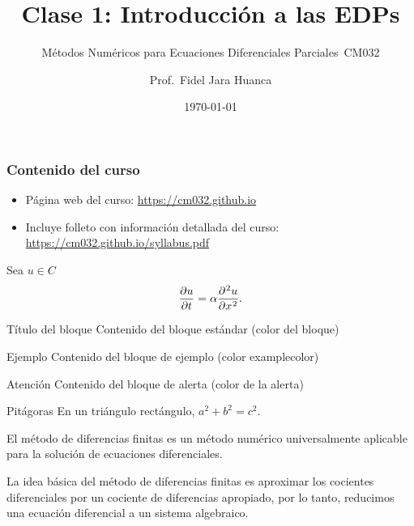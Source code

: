 \documentclass[
    8pt,
    aspectratio=1610,
    c,
    spanish,
    intlimits,
    handout,
    leqno,
    professionalfonts,
]{beamer}
\title{Clase 1: Introducción a las EDPs}
\subtitle{Métodos Numéricos para Ecuaciones Diferenciales Parciales~CM032}
\institute{
    Universidad Nacional de Ingeniería \\
    Escuela Profesional de Matemática \\
    Facultad de Ciencias
}
\author{Prof.~Fidel Jara Huanca}
\date{\today}
\begin{document}
\begin{frame}[plain]
	\titlepage
\end{frame}

\begin{frame}
	\frametitle{Contenido del curso}

	\begin{itemize}
		\item

		      Página web del curso: \url{https://cm032.github.io}

		\item

		      Incluye folleto con información detallada del curso: \url{https://cm032.github.io/syllabus.pdf}
	\end{itemize}
\end{frame}

\begin{frame}
	Sea $u\in C$
	\begin{equation*}
		\diffp{u}{t}=\alpha\diffp[2]{u}{x}.
	\end{equation*}
\end{frame}

\begin{frame}
	\begin{block}{Título del bloque}
		Contenido del bloque estándar (color del bloque)
	\end{block}

	\begin{exampleblock}{Ejemplo}
		Contenido del bloque de ejemplo (color examplecolor)
	\end{exampleblock}

	\begin{alertblock}{Atención}
		Contenido del bloque de alerta (color de la alerta)
	\end{alertblock}

	\begin{theorem}{Pitágoras}
		En un triángulo rectángulo, $a^2 + b^2 = c^2$.
	\end{theorem}
\end{frame}

\begin{frame}
	El método de diferencias finitas es un método numérico universalmente aplicable
	para la solución de ecuaciones diferenciales.

	La idea básica del método de diferencias finitas es aproximar los cocientes diferenciales por un cociente de diferencias apropiado,
	por lo tanto, reducimos una ecuación diferencial a un sistema algebraico.
\end{frame}
\end{document}
